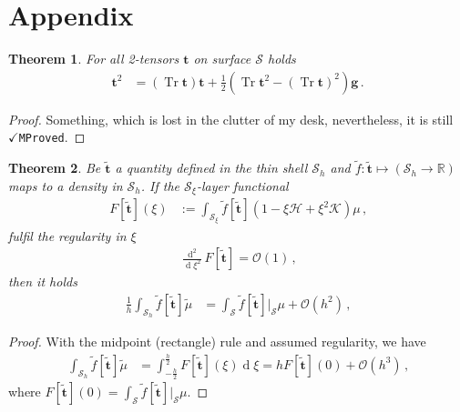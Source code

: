\documentclass[a4paper,10pt]{scrartcl}
\newcommand{\surf}{\mathcal{S}}
\newcommand{\surfh}{\surf_{h}}
\newcommand{\R}{\mathbb{R}}
\newcommand{\landau}{\mathcal{O}}
\newcommand{\gb}{\mathbf{g}}
\newcommand{\tb}{\mathbf{t}}
\newcommand{\trace}{\operatorname{Tr}}
\newcommand{\ttb}{\tilde{\tb}}
\newcommand{\tmu}{\tilde{\mu}}
\newcommand{\AtSurface}{\big|_{\surf}}
\newcommand{\meanc}{\mathcal{H}}
\newcommand{\gaussc}{\mathcal{K}}
\newcommand{\formComma}{\,\text{,}}
\newcommand{\formPeriod}{\,\text{.}}
\newtheorem{theorem}{Theorem}
\begin{document}
\section{Appendix}
  
  \begin{theorem}\label{thm:quadtwotensortheorem}
    For all 2-tensors \( \tb \) on surface \( \surf \) holds
    \begin{align}
      \tb^{2} &=  \left( \trace\tb \right)\tb + \frac{1}{2}\left( \trace\tb^{2}-  \left( \trace\tb \right)^{2} \right)\gb \formPeriod
    \end{align}
  \end{theorem}
  \begin{proof}
    Something, which is lost in the clutter of my desk, 
    nevertheless, it is still \( \checkmark\)\texttt{MProved}.
  \end{proof}

  \begin{theorem}\label{thm:midpointrule}
    Be \( \ttb  \) a quantity defined in the thin shell \( \surfh \) and
    \( \tilde{f}: \ttb \mapsto \left( \surfh \rightarrow \R \right) \) maps to a density in \( \surfh \).
    If the \(\surf_{\xi}  \)-layer functional
    \begin{align}
      F[\ttb](\xi) &:= \int_{\surf_{\xi}}\tilde{f}[\ttb]\left( 1-\xi\meanc+\xi^{2}\gaussc \right)\mu\formComma
    \end{align}
    fulfil the regularity in \( \xi \)
    \begin{align}
       \frac{\operatorname{d}^{2}}{\operatorname{d}\xi^{2}} F[\ttb] = \landau(1) \formComma
    \end{align}
    then it holds
    \begin{align}
      \frac{1}{h}\int_{\surfh} \tilde{f}[\ttb]\tmu
        &= \int_{\surf} \tilde{f}[\ttb]\AtSurface\mu + \landau(h^{2}) \formComma
    \end{align}
  \end{theorem}
  \begin{proof}
    With the midpoint (rectangle) rule and assumed regularity, we have
    \begin{align}
      \int_{\surfh} \tilde{f}[\ttb]\tmu &= \int_{-\frac{h}{2}}^{\frac{h}{2}}F[\ttb](\xi) \operatorname{d}\xi
            =hF[\ttb](0) + \landau(h^{3}) \formComma
    \end{align}
    where \( F[\ttb](0) = \int_{\surf} \tilde{f}[\ttb]\AtSurface\mu \). 
  \end{proof}




\end{document}
